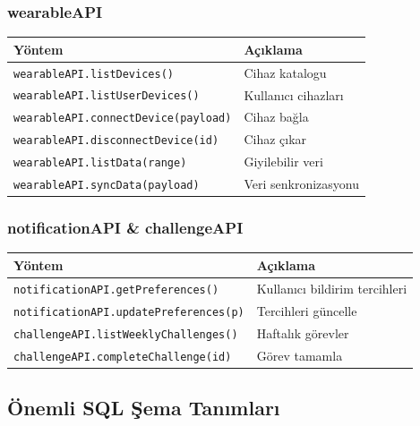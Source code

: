 \subsubsection{wearableAPI}

\begin{table}[H]
\centering
\small
\begin{tabular}{|l|p{}|}
\hline
\textbf{Yöntem} & \textbf{Açıklama} \\
\hline
\texttt{wearableAPI.listDevices()}            & Cihaz katalogu \\
\texttt{wearableAPI.listUserDevices()}        & Kullanıcı cihazları \\
\texttt{wearableAPI.connectDevice(payload)}   & Cihaz bağla \\
\texttt{wearableAPI.disconnectDevice(id)}     & Cihaz çıkar \\
\texttt{wearableAPI.listData(range)}          & Giyilebilir veri \\
\texttt{wearableAPI.syncData(payload)}        & Veri senkronizasyonu \\
\hline
\end{tabular}
\end{table}

\subsubsection{notificationAPI \& challengeAPI}

\begin{table}[H]
\centering
\small
\begin{tabular}{|l|p{}|}
\hline
\textbf{Yöntem} & \textbf{Açıklama} \\
\hline
\texttt{notificationAPI.getPreferences()}    & Kullanıcı bildirim tercihleri \\
\texttt{notificationAPI.updatePreferences(p)}& Tercihleri güncelle \\
\texttt{challengeAPI.listWeeklyChallenges()} & Haftalık görevler \\
\texttt{challengeAPI.completeChallenge(id)}  & Görev tamamla \\
\hline
\end{tabular}
\end{table}

\subsection{Önemli SQL Şema Tanımları}

